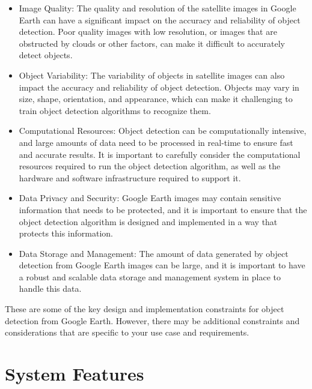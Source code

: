 	

	

	\begin{itemize}
		\item Image Quality: The quality and resolution of the satellite images in Google Earth can have a significant impact on the accuracy and reliability of object detection. Poor quality images with low resolution, or images that are obstructed by clouds or other factors, can make it difficult to accurately detect objects.
		\item Object Variability: The variability of objects in satellite images can also impact the accuracy and reliability of object detection. Objects may vary in size, shape, orientation, and appearance, which can make it challenging to train object detection algorithms to recognize them.
		\item Computational Resources: Object detection can be computationally intensive, and large amounts of data need to be processed in real-time to ensure fast and accurate results. It is important to carefully consider the computational resources required to run the object detection algorithm, as well as the hardware and software infrastructure required to support it.
		\item Data Privacy and Security: Google Earth images may contain sensitive information that needs to be protected, and it is important to ensure that the object detection algorithm is designed and implemented in a way that protects this information.
		\item Data Storage and Management: The amount of data generated by object detection from Google Earth images can be large, and it is important to have a robust and scalable data storage and management system in place to handle this data.
	\end{itemize}

These are some of the key design and implementation constraints for object detection from Google Earth. However, there may be additional constraints and considerations that are specific to your use case and requirements.
	
	
	
	
	
	
	
	
	
	
	
	
	
	
	\section{System Features}
	

